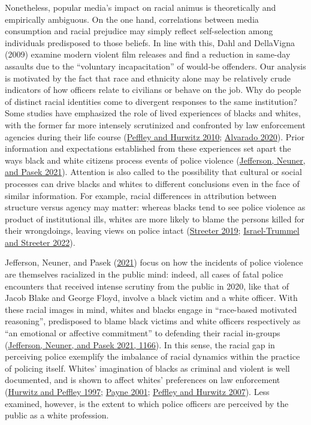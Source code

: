 \documentclass[
  12pt,
]{article}
\begin{document}
Nonetheless, popular media's impact on racial animus is theoretically
and empirically ambiguous. On the one hand, correlations between media
consumption and racial prejudice may simply reflect self-selection among
individuals predisposed to those beliefs. In line with this, Dahl and
DellaVigna (2009) examine modern violent film releases and find a
reduction in same-day assaults due to the ``voluntary incapacitation''
of would-be offenders. Our analysis is motivated by the fact that race
and ethnicity alone may be relatively crude indicators of how officers
relate to civilians or behave on the job. Why do people of distinct
racial identities come to divergent responses to the same institution?
Some studies have emphasized the role of lived experiences of blacks and
whites, with the former far more intensely scrutinized and confronted by
law enforcement agencies during their life course
(\protect\hyperlink{ref-peffley2010}{Peffley and Hurwitz 2010};
\protect\hyperlink{ref-alvarado2020}{Alvarado 2020}). Prior information
and expectations established from these experiences set apart the ways
black and white citizens process events of police violence
(\protect\hyperlink{ref-jefferson2021}{Jefferson, Neuner, and Pasek
2021}). Attention is also called to the possibility that cultural or
social processes can drive blacks and whites to different conclusions
even in the face of similar information. For example, racial differences
in attribution between structure versus agency may matter: whereas
blacks tend to see police violence as product of institutional ills,
whites are more likely to blame the persons killed for their
wrongdoings, leaving views on police intact
(\protect\hyperlink{ref-streeter2019}{Streeter 2019};
\protect\hyperlink{ref-israel-trummel2022}{Israel-Trummel and Streeter
2022}).

Jefferson, Neuner, and Pasek
(\protect\hyperlink{ref-jefferson2021}{2021}) focus on how the incidents
of police violence are themselves racialized in the public mind: indeed,
all cases of fatal police encounters that received intense scrutiny from
the public in 2020, like that of Jacob Blake and George Floyd, involve a
black victim and a white officer. With these racial images in mind,
whites and blacks engage in ``race-based motivated reasoning'',
predisposed to blame black victims and white officers respectively as
``an emotional or affective commitment'' to defending their racial
in-groups (\protect\hyperlink{ref-jefferson2021}{Jefferson, Neuner, and
Pasek 2021, 1166}). In this sense, the racial gap in perceiving police
exemplify the imbalance of racial dynamics within the practice of
policing itself. Whites' imagination of blacks as criminal and violent
is well documented, and is shown to affect whites' preferences on law
enforcement (\protect\hyperlink{ref-hurwitz1997}{Hurwitz and Peffley
1997}; \protect\hyperlink{ref-payne2001}{Payne 2001};
\protect\hyperlink{ref-peffley2007}{Peffley and Hurwitz 2007}). Less
examined, however, is the extent to which police officers are perceived
by the public as a white profession.
\end{document}
